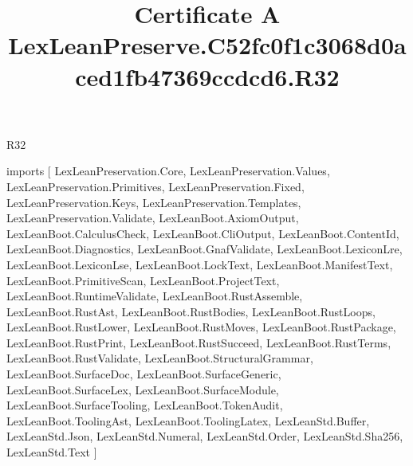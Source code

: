 \begin{lexlean}{R32}
\title{Certificate A LexLeanPreserve.C52fc0f1c3068d0aced1fb47369ccdcd6.R32}
\begin{coremodule}
imports [
  LexLeanPreservation.Core,
  LexLeanPreservation.Values,
  LexLeanPreservation.Primitives,
  LexLeanPreservation.Fixed,
  LexLeanPreservation.Keys,
  LexLeanPreservation.Templates,
  LexLeanPreservation.Validate,
  LexLeanBoot.AxiomOutput,
  LexLeanBoot.CalculusCheck,
  LexLeanBoot.CliOutput,
  LexLeanBoot.ContentId,
  LexLeanBoot.Diagnostics,
  LexLeanBoot.GnafValidate,
  LexLeanBoot.LexiconLre,
  LexLeanBoot.LexiconLse,
  LexLeanBoot.LockText,
  LexLeanBoot.ManifestText,
  LexLeanBoot.PrimitiveScan,
  LexLeanBoot.ProjectText,
  LexLeanBoot.RuntimeValidate,
  LexLeanBoot.RustAssemble,
  LexLeanBoot.RustAst,
  LexLeanBoot.RustBodies,
  LexLeanBoot.RustLoops,
  LexLeanBoot.RustLower,
  LexLeanBoot.RustMoves,
  LexLeanBoot.RustPackage,
  LexLeanBoot.RustPrint,
  LexLeanBoot.RustSucceed,
  LexLeanBoot.RustTerms,
  LexLeanBoot.RustValidate,
  LexLeanBoot.StructuralGrammar,
  LexLeanBoot.SurfaceDoc,
  LexLeanBoot.SurfaceGeneric,
  LexLeanBoot.SurfaceLex,
  LexLeanBoot.SurfaceModule,
  LexLeanBoot.SurfaceTooling,
  LexLeanBoot.TokenAudit,
  LexLeanBoot.ToolingAst,
  LexLeanBoot.ToolingLatex,
  LexLeanStd.Buffer,
  LexLeanStd.Json,
  LexLeanStd.Numeral,
  LexLeanStd.Order,
  LexLeanStd.Sha256,
  LexLeanStd.Text
]


\end{coremodule}
\end{lexlean}
